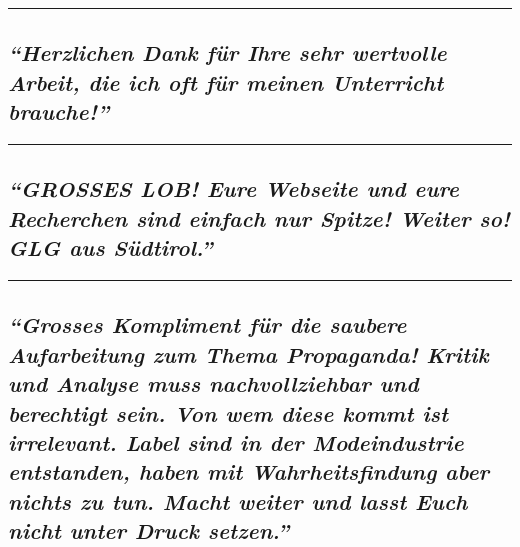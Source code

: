 \begin{center}\rule{0.5\linewidth}{\linethickness}\end{center}

\hypertarget{herzlichen-dank-fuxfcr-ihre-sehr-wertvolle-arbeit-die-ich-oft-fuxfcr-meinen-unterricht-brauche}{%
\subsection{\texorpdfstring{\emph{``Herzlichen Dank für Ihre sehr
wertvolle Arbeit, die ich oft für meinen Unterricht
brauche!''}}{``Herzlichen Dank für Ihre sehr wertvolle Arbeit, die ich oft für meinen Unterricht brauche!''}}\label{herzlichen-dank-fuxfcr-ihre-sehr-wertvolle-arbeit-die-ich-oft-fuxfcr-meinen-unterricht-brauche}}

\begin{center}\rule{0.5\linewidth}{\linethickness}\end{center}

\hypertarget{grosses-lob-eure-webseite-und-eure-recherchen-sind-einfach-nur-spitze-weiter-so-glg-aus-suxfcdtirol}{%
\subsection{\texorpdfstring{\emph{``GROSSES LOB! Eure Webseite und eure
Recherchen sind einfach nur Spitze! Weiter so! GLG aus
Südtirol.''}}{``GROSSES LOB! Eure Webseite und eure Recherchen sind einfach nur Spitze! Weiter so! GLG aus Südtirol.''}}\label{grosses-lob-eure-webseite-und-eure-recherchen-sind-einfach-nur-spitze-weiter-so-glg-aus-suxfcdtirol}}

\begin{center}\rule{0.5\linewidth}{\linethickness}\end{center}

\hypertarget{grosses-kompliment-fuxfcr-die-saubere-aufarbeitung-zum-thema-propaganda-kritik-und-analyse-muss-nachvollziehbar-und-berechtigt-sein-von-wem-diese-kommt-ist-irrelevant-label-sind-in-der-modeindustrie-entstanden-haben-mit-wahrheitsfindung-aber-nichts-zu-tun-macht-weiter-und-lasst-euch-nicht-unter-druck-setzen}{%
\subsection{\texorpdfstring{\emph{``Grosses Kompliment für die saubere
Aufarbeitung zum Thema Propaganda! Kritik und Analyse muss
nachvollziehbar und berechtigt sein. Von wem diese kommt ist irrelevant.
Label sind in der Modeindustrie entstanden, haben mit Wahrheitsfindung
aber nichts zu tun. Macht weiter und lasst Euch nicht unter Druck
setzen.''}}{``Grosses Kompliment für die saubere Aufarbeitung zum Thema Propaganda! Kritik und Analyse muss nachvollziehbar und berechtigt sein. Von wem diese kommt ist irrelevant. Label sind in der Modeindustrie entstanden, haben mit Wahrheitsfindung aber nichts zu tun. Macht weiter und lasst Euch nicht unter Druck setzen.''}}\label{grosses-kompliment-fuxfcr-die-saubere-aufarbeitung-zum-thema-propaganda-kritik-und-analyse-muss-nachvollziehbar-und-berechtigt-sein-von-wem-diese-kommt-ist-irrelevant-label-sind-in-der-modeindustrie-entstanden-haben-mit-wahrheitsfindung-aber-nichts-zu-tun-macht-weiter-und-lasst-euch-nicht-unter-druck-setzen}}

